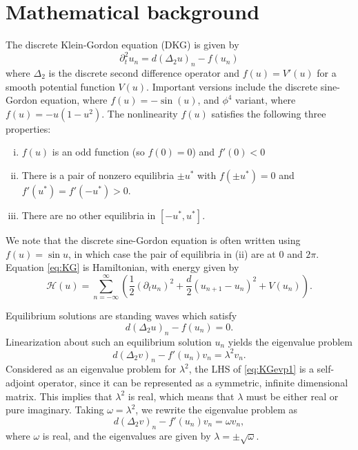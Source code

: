 \documentclass[12pt]{article}
\begin{document}
\section{Mathematical background}

The discrete Klein-Gordon equation (DKG) is given by
\begin{equation}\label{eq:KG}
\partial_t^2 u_n = d (\Delta_2 u)_n - f(u_n)
\end{equation}
where $\Delta_2$ is the discrete second difference operator and $f(u) = V'(u)$ for a smooth potential function $V(u)$. Important versions include the discrete sine-Gordon equation, where $f(u) = -\sin(u)$, and $\phi^4$ variant, where $f(u) = -u(1-u^2)$. The nonlinearity $f(u)$ satisfies the following three properties:
\begin{enumerate}[(i)]
	\item $f(u)$ is an odd function (so $f(0) = 0$) and $f'(0) < 0$
	\item There is a pair of nonzero equilibria $\pm u^*$ with $f(\pm u^*) = 0$ and $f'(u^*) = f'(-u^*) > 0$.
	\item There are no other equilibria in $[-u^*, u^*]$.
\end{enumerate}
We note that the discrete sine-Gordon equation is often written using $f(u) = \sin u$, in which case the pair of equilibria in (ii) are at 0 and $2 \pi$. Equation \cref{eq:KG} is Hamiltonian, with energy given by \cite{KevrekidisWeinstein2000}
\begin{equation}
	\mathcal{H}(u) = \sum_{n=-\infty}^\infty 
	\left( \frac{1}{2} (\partial_t u_n)^2 + \frac{d}{2} (u_{n+1} - u_n)^2 + V(u_n) \right).
\end{equation}

Equilibrium solutions are standing waves which satisfy 
\begin{equation}\label{eq:KGeq}
d (\Delta_2 u)_n - f(u_n) = 0.
\end{equation}
Linearization about such an equilibrium solution $u_n$ yields the eigenvalue problem
\begin{equation}\label{eq:KGevp1}
d (\Delta_2 v)_n - f'(u_n)v_n = \lambda^2 v_n.
\end{equation}
Considered as an eigenvalue problem for $ \lambda^2$, the LHS of \cref{eq:KGevp1} is a self-adjoint operator, since it can be represented as a symmetric, infinite dimensional matrix. This implies that $\lambda^2$ is real, which means that $\lambda$ must be either real or pure imaginary. Taking $\omega = \lambda^2$, we rewrite the eigenvalue problem as
\begin{equation}\label{eq:evp}
d (\Delta_2 v)_n - f'(u_n)v_n = \omega v_n,
\end{equation}
where $\omega$ is real, and the eigenvalues are given by $\lambda = \pm \sqrt{\omega}$.
\end{document}
